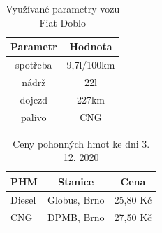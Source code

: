 \documentclass[a4paper, 11pt]{article}
\begin{document}
\begin{table}[h]
\centering
\begin{tabular}{cc}
\textbf{Parametr} & \textbf{Hodnota}                                                                                   \\ \hline
spotřeba & 9,7l/100km \\ \hline
nádrž  & 22l \\ \hline
dojezd &  227km \\ \hline
palivo & CNG
\end{tabular}
\caption{Využívané parametry vozu Fiat Doblo}
\label{tab:2}
\end{table}

\begin{table}[h]
\centering
\begin{tabular}{lcc}
\textbf{PHM} & \textbf{Stanice} & \textbf{Cena}                                                                                   \\ \hline
Diesel & Globus, Brno & 25,80 Kč \\ \hline
CNG & DPMB, Brno & 27,50 Kč
\end{tabular}
\caption{Ceny pohonných hmot ke dni 3. 12. 2020}
\label{tab:3}
\end{table}


 

\end{document}
